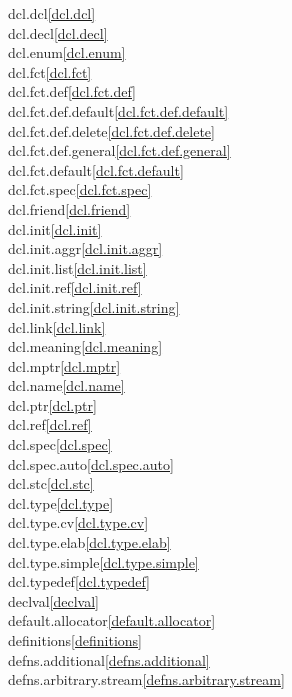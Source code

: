 \begin{multicols}{2}
dcl.dcl\quad\ref{dcl.dcl}\\
dcl.decl\quad\ref{dcl.decl}\\
dcl.enum\quad\ref{dcl.enum}\\
dcl.fct\quad\ref{dcl.fct}\\
dcl.fct.def\quad\ref{dcl.fct.def}\\
dcl.fct.def.default\quad\ref{dcl.fct.def.default}\\
dcl.fct.def.delete\quad\ref{dcl.fct.def.delete}\\
dcl.fct.def.general\quad\ref{dcl.fct.def.general}\\
dcl.fct.default\quad\ref{dcl.fct.default}\\
dcl.fct.spec\quad\ref{dcl.fct.spec}\\
dcl.friend\quad\ref{dcl.friend}\\
dcl.init\quad\ref{dcl.init}\\
dcl.init.aggr\quad\ref{dcl.init.aggr}\\
dcl.init.list\quad\ref{dcl.init.list}\\
dcl.init.ref\quad\ref{dcl.init.ref}\\
dcl.init.string\quad\ref{dcl.init.string}\\
dcl.link\quad\ref{dcl.link}\\
dcl.meaning\quad\ref{dcl.meaning}\\
dcl.mptr\quad\ref{dcl.mptr}\\
dcl.name\quad\ref{dcl.name}\\
dcl.ptr\quad\ref{dcl.ptr}\\
dcl.ref\quad\ref{dcl.ref}\\
dcl.spec\quad\ref{dcl.spec}\\
dcl.spec.auto\quad\ref{dcl.spec.auto}\\
dcl.stc\quad\ref{dcl.stc}\\
dcl.type\quad\ref{dcl.type}\\
dcl.type.cv\quad\ref{dcl.type.cv}\\
dcl.type.elab\quad\ref{dcl.type.elab}\\
dcl.type.simple\quad\ref{dcl.type.simple}\\
dcl.typedef\quad\ref{dcl.typedef}\\
declval\quad\ref{declval}\\
default.allocator\quad\ref{default.allocator}\\
definitions\quad\ref{definitions}\\
defns.additional\quad\ref{defns.additional}\\
defns.arbitrary.stream\quad\ref{defns.arbitrary.stream}\\

\end{multicols}
